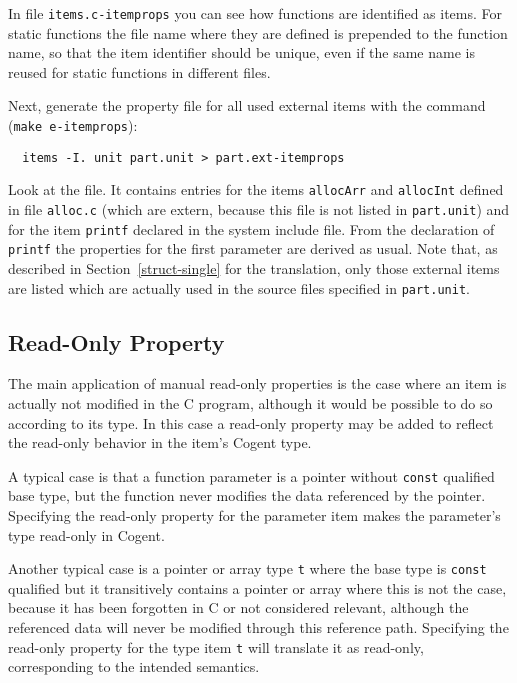 \documentclass[a4paper]{report}
\newcommand{\code}[1]{\textnormal{\texttt{#1}}}
\begin{document}
In file \code{items.c-itemprops} you can see how functions are identified as items. For static functions the file name where
they are defined is prepended to the function name, so that the item identifier should be unique, even if the same name 
is reused for static functions in different files.

Next, generate the property file for all used external items with the command (\code{make e-itemprops}):
\begin{verbatim}
  items -I. unit part.unit > part.ext-itemprops
\end{verbatim}

Look at the file. It contains entries for the items \code{allocArr} and \code{allocInt} defined in file \code{alloc.c} (which 
are extern, because this file is not listed in \code{part.unit}) and for the item \code{printf} declared in the system
include file. From the declaration of \code{printf} the properties for the first parameter are derived as usual. Note that,
as described in Section~\ref{struct-single} for the translation, only those external items are listed which are actually used in the 
source files specified in \code{part.unit}.

\subsection{Read-Only Property}
\label{types-manprops-ro}

The main application of manual read-only properties is the case where an item is actually not modified in the C program, 
although it would be possible to do so according to its type. In this case a read-only property may be added to reflect
the read-only behavior in the item's Cogent type.

A typical case is that a function parameter is a pointer without \code{const} qualified base type, but the function 
never modifies the data referenced by the pointer. Specifying the read-only property for the parameter item makes 
the parameter's type read-only in Cogent.

Another typical case is a pointer or array type \code{t} where the base type is \code{const} qualified but it transitively contains
a pointer or array where this is not the case, because it has been forgotten in C or not considered relevant, although
the referenced data will never be modified through this reference path. Specifying the read-only property for the type
item \code{t} will translate it as read-only, corresponding to the intended semantics.
\end{document}
